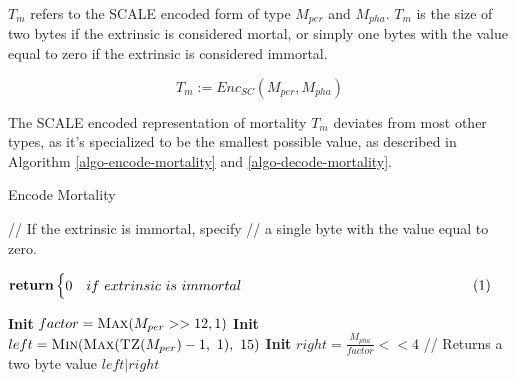 \begin{definition}
    $T_m$ refers to the SCALE encoded form of type $M_{per}$ and $M_{pha}$.
    $T_m$ is the size of two bytes if the extrinsic is considered mortal,
    or simply one bytes with the value equal to zero if the extrinsic is
    considered immortal.

    \[
        T_m := Enc_{SC}(M_{per}, M_{pha})
    \]

    The SCALE encoded representation of mortality $T_m$ deviates from most
    other types, as it's specialized to be the smallest possible value, as
    described in Algorithm \ref{algo-encode-mortality} and
    \ref{algo-decode-mortality}.

    \begin{algorithm}[H]
        \caption[]{\sc Encode Mortality}
        \label{algo-encode-mortality}
        \begin{algorithmic}[1]
            \Statex // If the extrinsic is immortal, specify
            \Statex // a single byte with the value equal to zero.
            \State $\vcenter{
                \begin{flalign*}
                    \Return & 
                    \begin{cases}
                    0 & if\ extrinsic\ is\ immortal 
                    \end{cases}&
                \end{flalign*}
            }$
            \State \textbf{Init} $factor = \textsc{Max}(M_{per} >> 12, 1)$
            \State \textbf{Init} $left = \textsc{Min}(\textsc{Max}(\textsc{TZ}(M_{per})-1,\ 1),\ 15)$
            \State \textbf{Init} $right = \frac{M_{pha}}{factor} << 4$
            \Statex
            \Statex // Returns a two byte value
            \State \Return $left|right$
        \end{algorithmic}
    \end{algorithm}


\end{definition}
